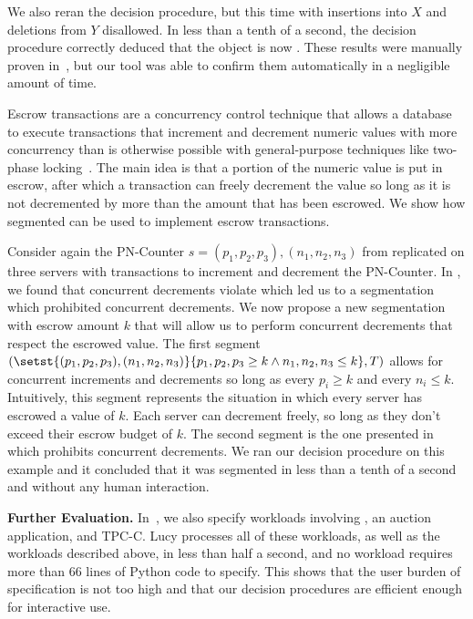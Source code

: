 We also reran the decision procedure, but this time with insertions into $X$
and deletions from $Y$ disallowed. In less than a tenth of a second, the
decision procedure correctly deduced that the object is now
\invariantconfluent{}. These results were manually proven
in~\cite{bailis2014coordination}, but our tool was able to confirm them
automatically in a negligible amount of time.

Escrow transactions are a concurrency control technique that allows a database
to execute transactions that increment and decrement numeric values with more
concurrency than is otherwise possible with general-purpose techniques like
two-phase locking~\cite{o1986escrow}. The main idea is that a portion of the
numeric value is put in escrow, after which a transaction can freely decrement
the value so long as it is not decremented by more than the amount that has
been escrowed. We show how segmented \invariantconfluence{} can be used to
implement escrow transactions.

Consider again the PN-Counter $s = (p_1, p_2, p_3), (n_1, n_2, n_3)$ from
 replicated on three servers with transactions
to increment and decrement the PN-Counter. In
, we found that concurrent decrements violate
\invariantconfluence{} which led us to a segmentation which prohibited
concurrent decrements. We now propose a new segmentation with escrow amount $k$
that will allow us to perform concurrent decrements that respect the escrowed
value. The first segment $(\setst{(p_1, p_2, p_3), (n_1, n_2, n_3)}{p_1, p_2,
p_3 \geq k \land n_1, n_2, n_3 \leq k}, T)$ allows for concurrent increments
and decrements so long as every $p_i \geq k$ and every $n_i \leq k$.
Intuitively, this segment represents the situation in which every server has
escrowed a value of $k$. Each server can decrement freely, so long as they don't
exceed their escrow budget of $k$. The second segment is the one presented in
 which prohibits concurrent decrements. We ran
our decision procedure on this example and it concluded that it was segmented
\invariantconfluent{} in less than a tenth of a second and without any human
interaction.

\vspace{4pt}
\textbf{Further Evaluation.}
In~\cite{whittaker2018interactive}, we also specify workloads involving
, an auction application, and TPC-C. Lucy processes all of
these workloads, as well as the workloads described above, in less than half a
second, and no workload requires more than 66 lines of Python code to specify.
This shows that the user burden of specification is not too high and that our
decision procedures are efficient enough for interactive use.

